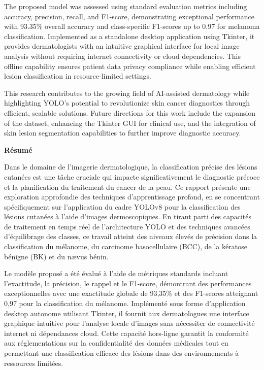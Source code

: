 \documentclass[a4paper,12pt]{report}
\begin{document}
\begin{spacing}{1.5}
    The proposed model was assessed using standard evaluation metrics including accuracy, precision, recall, and F1-score, demonstrating exceptional performance with 93.35\% overall accuracy and class-specific F1-scores up to 0.97 for melanoma classification. Implemented as a standalone desktop application using Tkinter, it provides dermatologists with an intuitive graphical interface for local image analysis without requiring internet connectivity or cloud dependencies. This offline capability ensures patient data privacy compliance while enabling efficient lesion classification in resource-limited settings.

    This research contributes to the growing field of AI-assisted dermatology while highlighting YOLO's potential to revolutionize skin cancer diagnostics through efficient, scalable solutions. Future directions for this work include the expansion of the dataset, enhancing the Tkinter GUI for clinical use, and the integration of skin lesion segmentation capabilities to further improve diagnostic accuracy.

    \newpage
\begin{center}
    \textbf{\huge Résumé}
\end{center}

    Dans le domaine de l'imagerie dermatologique, la classification précise des lésions cutanées est une tâche cruciale qui impacte significativement le diagnostic précoce et la planification du traitement du cancer de la peau. Ce rapport présente une exploration approfondie des techniques d'apprentissage profond, en se concentrant spécifiquement sur l'application du cadre YOLOv8 pour la classification des lésions cutanées à l'aide d'images dermoscopiques. En tirant parti des capacités de traitement en temps réel de l'architecture YOLO et des techniques avancées d'équilibrage des classes, ce travail atteint des niveaux élevés de précision dans la classification du mélanome, du carcinome basocellulaire (BCC), de la kératose bénigne (BK) et du nævus bénin.

    Le modèle proposé a été évalué à l'aide de métriques standards incluant l'exactitude, la précision, le rappel et le F1-score, démontrant des performances exceptionnelles avec une exactitude globale de 93,35\% et des F1-scores atteignant 0,97 pour la classification du mélanome. Implémenté sous forme d'application desktop autonome utilisant Tkinter, il fournit aux dermatologues une interface graphique intuitive pour l'analyse locale d'images sans nécessiter de connectivité internet ni dépendances cloud. Cette capacité hors-ligne garantit la conformité aux réglementations sur la confidentialité des données médicales tout en permettant une classification efficace des lésions dans des environnements à ressources limitées.


\end{spacing}
\end{document}
